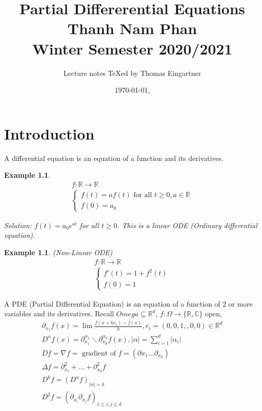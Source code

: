 \documentclass[ngerman, BCOR=5mm]{scrreprt}
\title{Partial Differerential Equations \\ Thanh Nam Phan \\ Winter Semester 2020/2021}
\author{Lecture notes \TeX ed by Thomas Eingartner}
\date{\today, \currenttime}
\theoremstyle{tommy}
\newtheorem{eg}[defn]{Example}
\begin{document}
\maketitle
\tableofcontents
\newpage



\chapter{Introduction}

A differential equation is an equation of a function and its derivatives. 

\begin{eg}
  \begin{align*}
    f: \mathbb{R} \to \mathbb{R} \\
    \begin{cases}
      f(t) = a f(t) \text{ for all } t \ge 0, a \in \mathbb{R} \\
      f(0) = a_0
    \end{cases}
  \end{align*}

  Solution: \(f(t) = a_0 e^{at}\) for all \(t \ge 0\). This is a linear ODE (Ordinary differential equation).
\end{eg}

\begin{eg} (Non-Linear ODE)
  \begin{align*}
    f: \mathbb{R} \to \mathbb{R} \\
    \begin{cases}
      f'(t) = 1 + f^2(t) \\
      f(0) = 1
    \end{cases}
  \end{align*}
\end{eg}

A PDE (Partial Differential Equation) is an equation of a function of 2 or more variables and its derivatives. Recall \(Omega \subseteq \mathbb{R}^d\), \(f: \Omega \to \{\mathbb{R}, \mathbb{C}\}\) open, 
\begin{align*}
  \partial_{x_1} f(x) = \lim \frac{f(x + he_i) - f(x)}{h}, e_i = (0,0, 1,, 0, 0) \in \mathbb{R}^d \\
  D^\alpha f(x) = \partial_{x_1}^{\alpha_1} \ddots \partial_{x_d}^{\alpha_d} f(x), |\alpha| = \sum_{i=1}^d |\alpha_i| \\
  Df = \nabla f = \text{ gradient of } f = (\partial{x_1} \dots \partial_{x_d}) \\
  \Delta f = \partial_{x_1}^2 + \dots + \partial^2_{x_d} f \\
  D^kf = (D^\alpha f)_{|\alpha| = k} \\
  D^2 f = (\partial_{x_i} \partial_{x_j} f)_{1 \le i, j \le d}
\end{align*}
\end{document}
